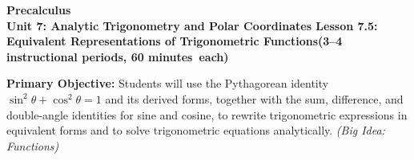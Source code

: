 \documentclass[10pt]{article}
\newcommand{\CourseName}{Precalculus}
\newcommand{\MeetingLength}{60 minutes}
\newcommand{\UnitNumberName}{Unit 7: Analytic Trigonometry and Polar Coordinates \quad}
\newcommand{\LessonNumberName}{Lesson 7.5: Equivalent Representations of Trigonometric Functions}
\begin{document}
\begin{center}
  {\Large\bfseries \CourseName} \\[4pt]
  {\small\bfseries \UnitNumberName \LessonNumberName \quad (3--4 instructional periods, \MeetingLength\ each)}
\end{center}

\begin{tcolorbox}[colback=sky, colframe=navy, boxrule=0.9pt, arc=2mm,
    left=2mm, right=2mm, top=1.5mm, bottom=1.5mm]
  \textbf{Primary Objective:} Students will use the Pythagorean identity
  $\sin^2\theta + \cos^2\theta = 1$ and its derived forms, together with the
  sum, difference, and double-angle identities for sine and cosine, to rewrite
  trigonometric expressions in equivalent forms and to solve trigonometric
  equations analytically.
  \textit{(Big Idea: Functions)}
\end{tcolorbox}

\vspace{0.08in}
\end{document}
